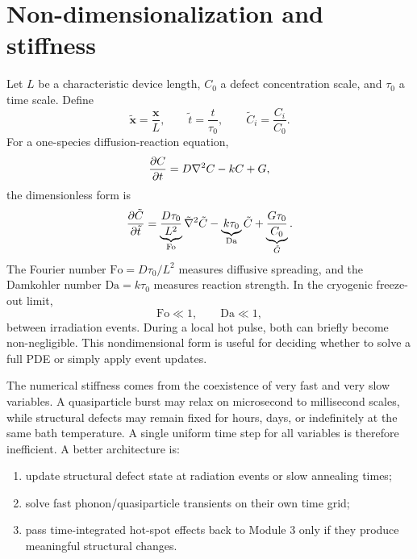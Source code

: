 \documentclass[11pt]{article}
\newcommand{\x}{\mathbf{x}}
\begin{document}
\section{Non-dimensionalization and stiffness}

Let $L$ be a characteristic device length, $C_0$ a defect concentration scale, and $\tau_0$ a time scale. Define
\begin{equation}
\tilde{\x}=\frac{\x}{L},\qquad
\tilde{t}=\frac{t}{\tau_0},\qquad
\tilde{C}_i=\frac{C_i}{C_0}.
\end{equation}
For a one-species diffusion-reaction equation,
\begin{equation}
\pdv{C}{t}=D\nabla^2 C-kC+G,
\end{equation}
the dimensionless form is
\begin{equation}
\pdv{\tilde{C}}{\tilde{t}}
=\underbrace{\frac{D\tau_0}{L^2}}_{\mathrm{Fo}}
\tilde{\nabla}^2\tilde{C}
-\underbrace{k\tau_0}_{\mathrm{Da}}\tilde{C}
+\underbrace{\frac{G\tau_0}{C_0}}_{\tilde{G}}.
\label{eq:dimensionless_m3}
\end{equation}
The Fourier number $\mathrm{Fo}=D\tau_0/L^2$ measures diffusive spreading, and the Damkohler number $\mathrm{Da}=k\tau_0$ measures reaction strength. In the cryogenic freeze-out limit,
\begin{equation}
\mathrm{Fo}\ll 1,
\qquad
\mathrm{Da}\ll 1,
\end{equation}
between irradiation events. During a local hot pulse, both can briefly become non-negligible. This nondimensional form is useful for deciding whether to solve a full PDE or simply apply event updates.

The numerical stiffness comes from the coexistence of very fast and very slow variables. A quasiparticle burst may relax on microsecond to millisecond scales, while structural defects may remain fixed for hours, days, or indefinitely at the same bath temperature. A single uniform time step for all variables is therefore inefficient. A better architecture is:
\begin{enumerate}[label=\arabic*.]
\item update structural defect state at radiation events or slow annealing times;
\item solve fast phonon/quasiparticle transients on their own time grid;
\item pass time-integrated hot-spot effects back to Module 3 only if they produce meaningful structural changes.
\end{enumerate}
\end{document}
